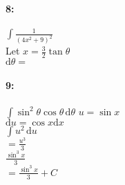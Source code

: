 \documentclass[12pt]{article}
\newcommand{\dx}{\mathrm{d}x}
\newcommand{\du}{\mathrm{d}u}
\newcommand{\dtheta}{\mathrm{d}\theta}
\begin{document}
    \paragraph*{8:\\}
    $\int\!\frac{1}{(4x^2+9)^2}$\\
    Let $x = \frac{3}{2}\tan{\theta}$\\
    $\dtheta =$

    \paragraph*{9:\\}
    $\int\!\sin^2{\theta}\cos{\theta}\,\dtheta$
    $u = \sin{x}$\\
    $\du = \cos{x}\dx$\\
    $\int\!u^2\,\du$\\
    $= \frac{u^3}{3}$\\
    $\frac{\sin^3{x}}{3}$\\
    $= \frac{\sin^{3}{x}}{3} + C$\\
\end{document}
